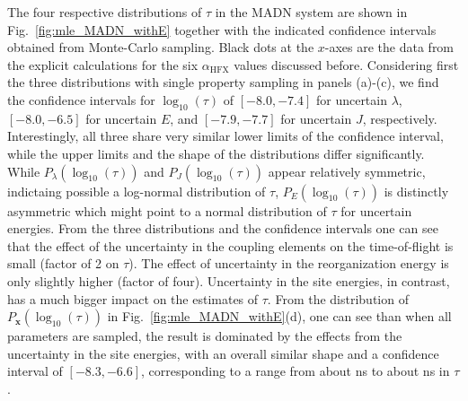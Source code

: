 \documentclass[%
 reprint,
superscriptaddress,
 amsmath,amssymb,
 aps,
prb,
floatfix
]{revtex4-2}
\newcommand{\ahfx}{\ensuremath{\alpha_\text{HFX}}\xspace}
\begin{document}

The four respective distributions of $\tau$ in the MADN system are shown in Fig.~\ref{fig:mle_MADN_withE} together with the indicated confidence intervals obtained from Monte-Carlo sampling. Black dots at the $x$-axes are the data from the explicit calculations for the six \ahfx values discussed before. Considering first the three distributions with single property sampling in panels (a)-(c), we find the confidence intervals for $\log_{10}(\tau)$ of $[-8.0,-7.4]$ for uncertain $\lambda$, $[-8.0,-6.5]$ for uncertain $E$, and $[-7.9,-7.7]$ for uncertain $J$, respectively. Interestingly, all three share very similar lower limits of the confidence interval, while the upper limits and the shape of the distributions differ significantly. While $P_\lambda(\log_{10}(\tau))$ and $P_J(\log_{10}(\tau))$ appear relatively symmetric, indictaing possible a log-normal distribution of $\tau$, $P_E(\log_{10}(\tau))$ is distinctly asymmetric which might point to a normal distribution of $\tau$ for uncertain energies. From the three distributions and the confidence intervals one can see that the effect of the uncertainty in the coupling elements on the time-of-flight is small (factor of 2 on $\tau$). The effect of uncertainty in the reorganization energy is only slightly higher (factor of four). Uncertainty in the site energies, in contrast, has a much bigger impact on the estimates of $\tau$. From the distribution of $P_\mathbf{x}(\log_{10}(\tau))$ in Fig.~\ref{fig:mle_MADN_withE}(d), one can see than when all parameters are sampled, the result is dominated by the effects from the uncertainty in the site energies, with an overall similar shape and a confidence interval of $[-8.3,-6.6]$, corresponding to a range from about \unit[5]{ns} to about \unit[250]{ns} in $\tau$. 
\end{document}
